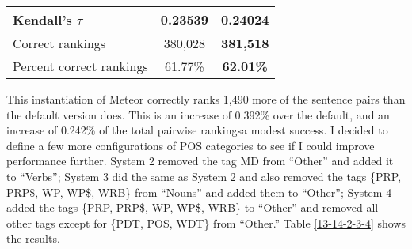 \documentclass[paper=a4, fontsize=11pt]{scrartcl}
\numberwithin{equation}{section}		%
\numberwithin{figure}{section}			%
\numberwithin{table}{section}				%
\begin{document}
\begin{table}[htbp]
{\begin{tabular}{llllllclll|}
\multicolumn{2}{|l|}{Kendall's $\tau$}                                                           & \multicolumn{4}{c|}{0.23539}                                                                              & \multicolumn{4}{c|}{{\bf 0.24024}}                                                                                \\ \hline
\multicolumn{2}{|l|}{Correct rankings}                                                           & \multicolumn{4}{c|}{380,028}                                                                              & \multicolumn{4}{c|}{{\bf 381,518}}                                                                                \\ \hline
\multicolumn{2}{|l|}{Percent correct rankings}                                                   & \multicolumn{4}{c|}{61.77\%}                                                                              & \multicolumn{4}{c|}{{\bf 62.01\%}}                                                                                \\ \hline
\end{tabular}}
\end{table}

This instantiation of Meteor correctly ranks 1,490 more of the sentence pairs than the default version does.  This is an increase of 0.392\% over the default, and an increase of 0.242\% of the total pairwise rankings\textemdash a modest success.  I decided to define a few more configurations of POS categories to see if I could improve performance further.  System 2 removed the tag MD from ``Other'' and added it to ``Verbs''; System 3 did the same as System 2 and also removed the tags \{PRP, PRP\$, WP, WP\$, WRB\} from ``Nouns'' and added them to ``Other''; System 4 added the tags \{PRP, PRP\$, WP, WP\$, WRB\} to ``Other'' and removed all other tags except for \{PDT, POS, WDT\} from ``Other.''    Table \ref{13-14-2-3-4} shows the results.
\end{document}
